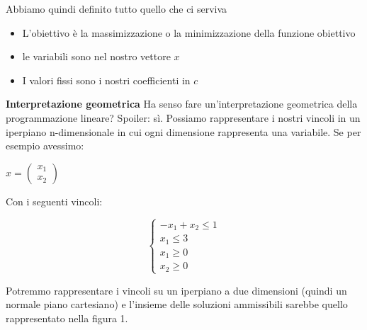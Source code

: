 \documentclass{article}
\begin{document}
    Abbiamo quindi definito tutto quello che ci serviva
    \begin{itemize}
        \item L'obiettivo è la massimizzazione o la minimizzazione della funzione obiettivo
        \item le variabili sono nel nostro vettore $x$
        \item I valori fissi sono i nostri coefficienti in $c$
    \end{itemize}
    \textbf{Interpretazione geometrica}
    \newline
    Ha senso fare un'interpretazione geometrica della programmazione lineare? Spoiler: sì.\newline
    Possiamo rappresentare i nostri vincoli in un iperpiano n-dimensionale in cui ogni dimensione rappresenta una variabile. Se per esempio avessimo:
    \begin{center}
    $x = \begin{pmatrix}
        x_{1} \\
        x_{2}
    \end{pmatrix}$
    \end{center}
    Con i seguenti vincoli:
    \begin{center}
    \begin{equation}
    \begin{cases}
        -x_{1}+x_{2} \le 1 \\
        x_{1} \le 3 \\
        x_{1} \ge 0 \\
        x_{2} \ge 0
    \end{cases}
    \end{equation}
    \end{center}

    Potremmo rappresentare i vincoli su un iperpiano a due dimensioni (quindi un normale piano cartesiano) e l'insieme delle soluzioni ammissibili sarebbe quello rappresentato nella figura 1.
    
\end{document}
